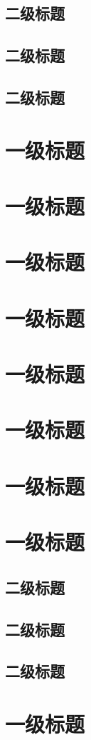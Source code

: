 \documentclass[printMode=false, declarePage=false]{ecnuthesis}
\begin{document}
\section{二级标题}
\section{二级标题}
\section{二级标题}

\chapter{一级标题}

\chapter{一级标题}
\chapter{一级标题}
\chapter{一级标题}
\chapter{一级标题}
\chapter{一级标题}
\chapter{一级标题}
\chapter{一级标题}
\section{二级标题}
\section{二级标题}
\section{二级标题}
\chapter{一级标题}
\end{document}
